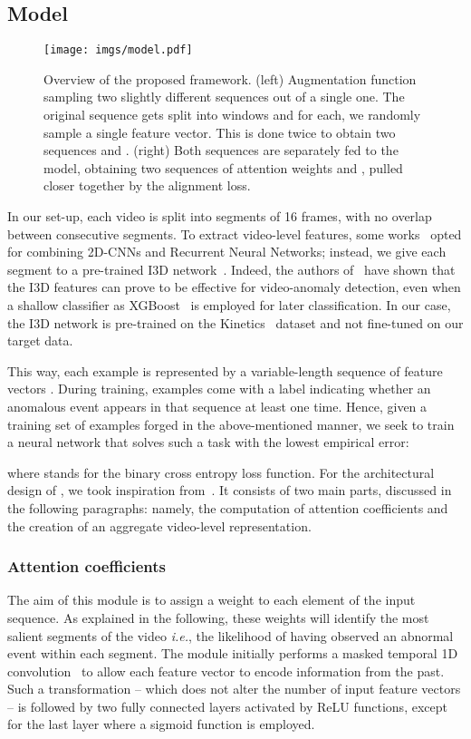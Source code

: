 \documentclass[runningheads]{llncs}
\begin{document}
\subsection{Model}\label{sec:model}
\begin{figure}[t]
    \centering
    \texttt{[image: imgs/model.pdf]}
    \caption{Overview of the proposed framework. (left) Augmentation function sampling two slightly different sequences out of a single one. The original sequence gets split into windows and for each, we randomly sample a single feature vector. This is done twice to obtain two sequences  and . (right) Both sequences are separately fed to the model, obtaining two sequences of attention weights  and , pulled closer together by the alignment loss.}
    \label{fig:model}
\end{figure}
In our set-up, each video is split into segments of 16 frames, with no overlap between consecutive segments. To extract video-level features, some works~\cite{yue2015beyond,cascianelli2019role} opted for combining 2D-CNNs and Recurrent Neural Networks; instead, we give each segment to a pre-trained I3D network~\cite{carreira2017quo}. Indeed, the authors of~\cite{koshti2020video} have shown that the I3D features can prove to be effective for video-anomaly detection, even when a shallow classifier as XGBoost~\cite{chen2016xgboost,candeloro2020predicting} is employed for later classification. In our case, the I3D network is pre-trained on the Kinetics~\cite{kay2017kinetics} dataset and not fine-tuned on our target data. 

This way, each example is represented by a variable-length sequence of  feature vectors . During training, examples come with a label  indicating whether an anomalous event appears in that sequence at least one time. Hence, given a training set of examples  forged in the above-mentioned manner, we seek to train a neural network  that solves such a task with the lowest empirical error:

where  stands for the binary cross entropy loss function.
For the architectural design of , we took inspiration from~\cite{nguyen2018weakly}. It consists of two main parts, discussed in the following paragraphs: namely, the computation of attention coefficients and the creation of an aggregate video-level representation. 
\subsubsection{Attention coefficients} The aim of this module is to assign a weight  to each element of the input sequence. As explained in the following, these weights will identify the most salient segments of the video \textit{i.e.}, the likelihood of having observed an abnormal event within each segment. The module initially performs a masked temporal 1D convolution~\cite{lea2017temporal} to allow each feature vector to encode information from the past. Such a transformation -- which does not alter the number of input feature vectors -- is followed by two fully connected layers activated by ReLU functions, except for the last layer where a sigmoid function is employed.
\end{document}
